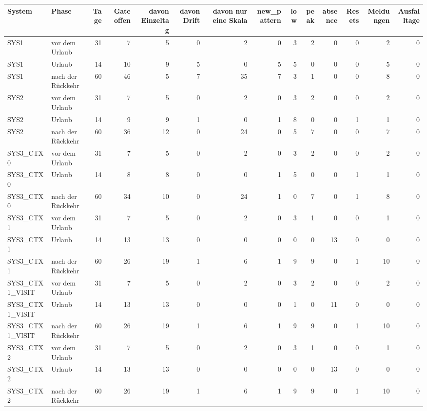 \begin{tabular}{llrrrrrrrrrrrr}
\toprule
System & Phase & Tage & Gate offen & davon Einzeltag & davon Drift & davon nur eine Skala & new\_pattern & low & peak & absence & Resets & Meldungen & Ausfalltage \\
\midrule
SYS1 & vor dem Urlaub & 31 & 7 & 5 & 0 & 2 & 0 & 3 & 2 & 0 & 0 & 2 & 0 \\
SYS1 & Urlaub & 14 & 10 & 9 & 5 & 0 & 5 & 5 & 0 & 0 & 0 & 5 & 0 \\
SYS1 & nach der Rückkehr & 60 & 46 & 5 & 7 & 35 & 7 & 3 & 1 & 0 & 0 & 8 & 0 \\
SYS2 & vor dem Urlaub & 31 & 7 & 5 & 0 & 2 & 0 & 3 & 2 & 0 & 0 & 2 & 0 \\
SYS2 & Urlaub & 14 & 9 & 9 & 1 & 0 & 1 & 8 & 0 & 0 & 1 & 1 & 0 \\
SYS2 & nach der Rückkehr & 60 & 36 & 12 & 0 & 24 & 0 & 5 & 7 & 0 & 0 & 7 & 0 \\
SYS3\_CTX0 & vor dem Urlaub & 31 & 7 & 5 & 0 & 2 & 0 & 3 & 2 & 0 & 0 & 2 & 0 \\
SYS3\_CTX0 & Urlaub & 14 & 8 & 8 & 0 & 0 & 1 & 5 & 0 & 0 & 1 & 1 & 0 \\
SYS3\_CTX0 & nach der Rückkehr & 60 & 34 & 10 & 0 & 24 & 1 & 0 & 7 & 0 & 1 & 8 & 0 \\
SYS3\_CTX1 & vor dem Urlaub & 31 & 7 & 5 & 0 & 2 & 0 & 3 & 1 & 0 & 0 & 1 & 0 \\
SYS3\_CTX1 & Urlaub & 14 & 13 & 13 & 0 & 0 & 0 & 0 & 0 & 13 & 0 & 0 & 0 \\
SYS3\_CTX1 & nach der Rückkehr & 60 & 26 & 19 & 1 & 6 & 1 & 9 & 9 & 0 & 1 & 10 & 0 \\
SYS3\_CTX1\_VISIT & vor dem Urlaub & 31 & 7 & 5 & 0 & 2 & 0 & 3 & 2 & 0 & 0 & 2 & 0 \\
SYS3\_CTX1\_VISIT & Urlaub & 14 & 13 & 13 & 0 & 0 & 0 & 1 & 0 & 11 & 0 & 0 & 0 \\
SYS3\_CTX1\_VISIT & nach der Rückkehr & 60 & 26 & 19 & 1 & 6 & 1 & 9 & 9 & 0 & 1 & 10 & 0 \\
SYS3\_CTX2 & vor dem Urlaub & 31 & 7 & 5 & 0 & 2 & 0 & 3 & 1 & 0 & 0 & 1 & 0 \\
SYS3\_CTX2 & Urlaub & 14 & 13 & 13 & 0 & 0 & 0 & 0 & 0 & 13 & 0 & 0 & 0 \\
SYS3\_CTX2 & nach der Rückkehr & 60 & 26 & 19 & 1 & 6 & 1 & 9 & 9 & 0 & 1 & 10 & 0 \\
\bottomrule
\end{tabular}
